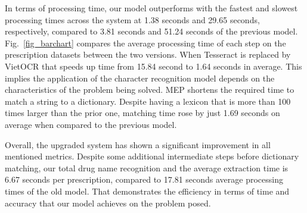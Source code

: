 In terms of processing time, our model outperforms with the fastest and slowest processing times across the system at 1.38 seconds and 29.65 seconds, respectively, compared to 3.81 seconds and 51.24 seconds of the previous model. Fig.~\ref{fig_barchart} compares the average processing time of each step on the prescription datasets between the two versions. When Tesseract is replaced by VietOCR that speeds up time from 15.84 second to 1.64 seconds in average. This implies the application of the character recognition model depends on the characteristics of the problem being solved. MEP shortens the required time to match a string to a dictionary. Despite having a lexicon that is more than 100 times larger than the prior one, matching time rose by just 1.69 seconds on average when compared to the previous model.

Overall, the upgraded system has shown a significant improvement in all mentioned metrics. Despite some additional intermediate steps before dictionary matching, our total drug name recognition and the average extraction time is 6.67 seconds per prescription, compared to 17.81 seconds average processing times of the old model. That demonstrates the efficiency in terms of time and accuracy that our model achieves on the problem posed.
